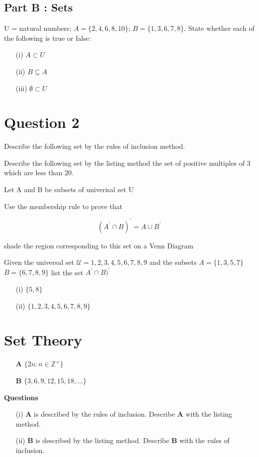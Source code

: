 \documentclass[]{report}
\begin{document}
	\subsection*{Part B : Sets}
	U = {natural numbers}; $A = \{2, 4, 6, 8, 10\}$; $B = \{1, 3, 6, 7, 8\}$. State whether each of the following is true or false:
	\begin{itemize}
		\item[(i)] $A \subset U$
		\item[(ii)] $B \subseteq A$
		\item[(iii)] $\emptyset \subset U$
	\end{itemize}
	
	
	
	\section*{Question 2}
	Describe the following set by the rules of inclusion method.
	
	Describe the following set by the listing method
	the set of positive multiples of 3 which are less than 20.
	
	Let A and B be subsets of univerisal set U
	
	Use the membership rule to prove that
	
	\[(A^\prime  \cap B)^\prime = A \cup B^\prime\]
	
	shade the region corresponding to this set on a Venn Diagram
	
	Given the universal set $\mathcal{U} = {1,2,3,4,5,6,7,8,9}$
	and the subsets $A=\{1,3,5,7\}$
	$B = \{6,7,8,9\}$
	list the set $A^\prime \cap B)^\prime$ 
	
	
	\Large
\begin{itemize}
	\item[(i)] $\{5,8\}$
	\item[(ii)] $\{1,2,3,4,5,6,7,8,9\}$ 
\end{itemize}


\section{Set Theory}

\Large
\begin{itemize}
	\item[\textbf{A}] $ \{ 2n : n \in \mathbb{Z^{+}} \} $
	\item[\textbf{B}] $ \{ 3,6,9,12,15,18,\ldots \} $
\end{itemize}
\textbf{Questions}
\begin{itemize}
	\item[(i)] \textbf{A} is described by the rules of inclusion. Describe \textbf{A} with the listing method.
	\item[(ii)] \textbf{B} is described by the listing method. Describe \textbf{B} with the rules of inclusion. 
\end{itemize}
\end{document}

